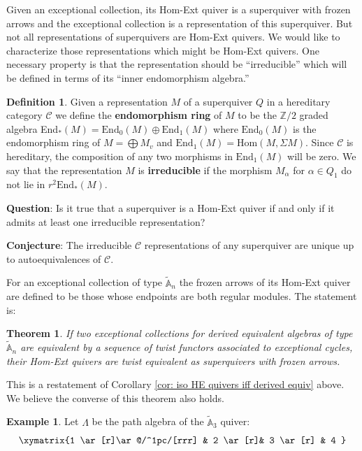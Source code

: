 \documentclass[12pt]{amsart}
\theoremstyle{plain}
\newtheorem{thm}{Theorem}[section]
\theoremstyle{definition}
\newtheorem{defn}{Definition}[section]
\newtheorem{exmp}{Example}
    [section]
\theoremstyle{remark}
\begin{document}
{
Given an exceptional collection, its Hom-Ext quiver is a superquiver with frozen arrows and the exceptional collection is a representation of this superquiver. But not all representations of superquivers are Hom-Ext quivers. We would like to characterize those representations which might be Hom-Ext quivers. One necessary property is that the representation should be ``irreducible'' which will be defined in terms of its ``inner endomorphism algebra.''

\begin{defn}
    Given a representation $M$ of a superquiver $Q$ in a hereditary category $\mathcal C$ we define the \textbf{endomorphism ring} of $M$ to be the $\mathbb Z/2$ graded algebra End$_\ast(M)=\text{End}_0(M)\oplus \text{End}_1(M)$ where $\text{End}_0(M)$ is the endomorphism ring of $M=\bigoplus M_v$ and $\text{End}_1(M)=\text{Hom}(M,\Sigma M)$. Since $\mathcal C$ is hereditary, the composition of any two morphisms in $\text{End}_1(M)$ will be zero. We say that the representation $M$ is \textbf{irreducible} if the morphism $M_\alpha$ for $\alpha\in Q_1$ do not lie in $r^2\text{End}_\ast(M)$. 
   \end{defn}

\textbf{Question}: Is it true that a superquiver is a Hom-Ext quiver if and only if it admits at least one irreducible representation?

\textbf{Conjecture}: The irreducible $\mathcal C$ representations of any superquiver are unique up to autoequivalences of $\mathcal C$. 


For an exceptional collection of type $\tilde{\mathbb{A}}_n$ the frozen arrows of its Hom-Ext quiver are defined to be those whose endpoints are both regular modules. The statement is:


\begin{thm} \label{thm: superquiver twists}
If two exceptional collections for derived equivalent algebras of type $\tilde{\mathbb{A}}_n$ are equivalent by {\color{black} a sequence of twist functors associated to exceptional cycles}, their Hom-Ext quivers are twist equivalent as superquivers with frozen arrows.
\end{thm}

This is a restatement of Corollary \ref{cor: iso HE quivers iff derived equiv} above. We believe the converse of this theorem also holds.

\begin{exmp}
Let $\Lambda$ be the path algebra of the $\tilde{\mathbb{A}}_3$ quiver:
\[
\xymatrix{%
1 \ar[r]\ar@/^1pc/[rrr] & 
	2 \ar[r]&
	3 \ar[r] & 4 
	} %
\]


\end{exmp}}
\end{document}
